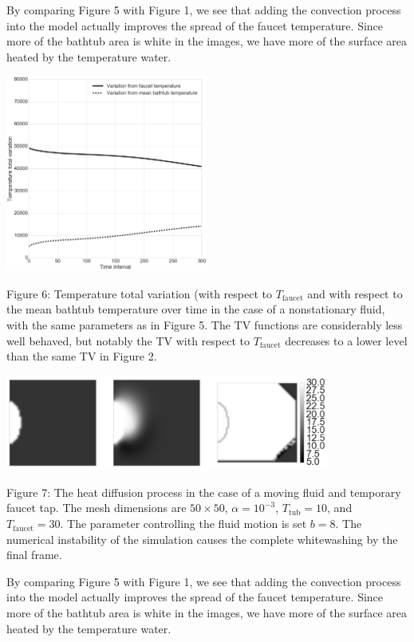\documentclass[12pt]{amsart}
\begin{document}
By comparing Figure 5 with Figure 1, we see that adding the convection process
into the model actually improves the spread of the faucet temperature. Since
more of the bathtub area is white in the images, we have more of the surface
area heated by the temperature water.

\begin{center}
    \includegraphics[width=0.5\textwidth]{../plots/tv-03.png}

    Figure 6: Temperature total variation (with respect to $T_{\mathrm{faucet}}$
    and with respect to the mean bathtub temperature over time in the case of a
    nonstationary fluid, with the same parameters as in Figure 5. The TV
    functions are considerably less well behaved, but notably the TV with
    respect to $T_{\mathrm{faucet}}$ decreases to a lower level than the same TV
    in Figure 2.
\end{center}

\begin{center}
    \includegraphics[width=0.8\textwidth]{../plots/diffusion-04.png}

    Figure 7: The heat diffusion process in the case of a moving fluid and
    temporary faucet tap. The mesh dimensions are $50 \times 50$, $\alpha =
    10^{-3}$, $T_{\mathrm{tub}} = 10$, and $T_{\mathrm{faucet}} = 30$. The
    parameter controlling the fluid motion is set $b = 8$. The numerical
    instability of the simulation causes the complete whitewashing by the final
    frame.
\end{center}

By comparing Figure 5 with Figure 1, we see that adding the convection process
into the model actually improves the spread of the faucet temperature. Since
more of the bathtub area is white in the images, we have more of the surface
area heated by the temperature water.
\end{document}
